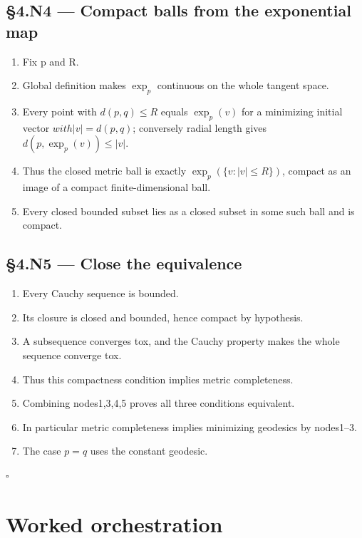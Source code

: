 \documentclass[preprint,12pt,aps,pra,showkeys,amsmath,amssymb,superscriptaddress,floatfix]{revtex4-2}
\theoremstyle{definition}
\theoremstyle{remark}
\begin{document}
\subsection{§4.N4 --- Compact balls from the exponential
map}\label{n4-compact-balls-from-the-exponential-map}

\begin{enumerate}
\def\labelenumi{\arabic{enumi}.}
\item
  Fix p and R.
\item
  Global definition makes \(\operatorname{exp} _p\) continuous on the
  whole tangent space.
\item
  Every point with \(d(p,q)\le R\) equals \(\operatorname{exp} _p(v)\)
  for a minimizing initial vector \(with|v|=d(p,q)\); conversely radial
  length gives \(d(p,\operatorname{exp} _p(v))\le |v|\).
\item
  Thus the closed metric ball is exactly
  \(\operatorname{exp} _p(\{v:|v|\le R\})\), compact as an image of a
  compact finite-dimensional ball.
\item
  Every closed bounded subset lies as a closed subset in some such ball
  and is compact.
\end{enumerate}

\subsection{§4.N5 --- Close the
equivalence}\label{n5-close-the-equivalence}

\begin{enumerate}
\def\labelenumi{\arabic{enumi}.}
\item
  Every Cauchy sequence is bounded.
\item
  Its closure is closed and bounded, hence compact by hypothesis.
\item
  A subsequence converges tox, and the Cauchy property makes the whole
  sequence converge tox.
\item
  Thus this compactness condition implies metric completeness.
\item
  Combining nodes1,3,4,5 proves all three conditions equivalent.
\item
  In particular metric completeness implies minimizing geodesics by
  nodes1--3.
\item
  The case \(p=q\) uses the constant geodesic.
\end{enumerate}

\hfill$\square$

\section{Worked orchestration}
\end{document}
